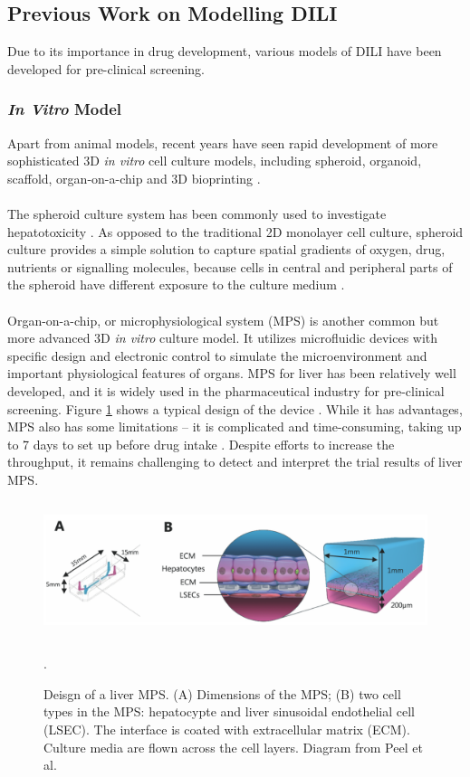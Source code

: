 \documentclass[12pt]{article}
\begin{document}
\subsection{Previous Work on Modelling DILI}
Due to its importance in drug development, various models of DILI have been developed for pre-clinical screening.
\subsubsection{\textit{In Vitro} Model}
Apart from animal models, recent years have seen rapid development of more sophisticated 3D \textit{in vitro} cell culture models, including spheroid, organoid, scaffold, organ-on-a-chip and 3D bioprinting \cite{fangThreeDimensionalCellCultures}.\\\\
The spheroid culture system has been commonly used to investigate hepatotoxicity \cite{leedaleSilicoguidedOptimisationOxygen2019}. As opposed to the traditional 2D monolayer cell culture, spheroid culture provides a simple solution to capture spatial gradients of oxygen, drug, nutrients or signalling molecules, because cells in central and peripheral parts of the spheroid have different exposure to the culture medium \cite{fangThreeDimensionalCellCultures}.\\\\Organ-on-a-chip, or microphysiological system (MPS) is another common but more advanced 3D \textit{in vitro} culture model. It utilizes microfluidic devices with specific design and electronic control to simulate the microenvironment and important physiological features of organs. MPS for liver has been relatively well developed, and it is widely used in the pharmaceutical industry for pre-clinical screening. Figure \ref{fig:2} shows a typical design of the device \cite{peelIntroducingAutomatedHigh2019a}. While it has advantages, MPS also has some limitations – it is complicated and time-consuming, taking up to 7 days to set up before drug intake \cite{peelIntroducingAutomatedHigh2019a}.
Despite efforts to increase the throughput, it remains challenging to detect and interpret the trial results of liver MPS.

\begin{figure}[h!]
\centering
\includegraphics[width = 14cm, height = 4cm]{mps.png}
\caption{Deisgn of a liver MPS. (A) Dimensions of the MPS; (B) two cell types in the MPS: hepatocypte and liver sinusoidal endothelial cell (LSEC). The interface is coated with extracellular matrix (ECM). Culture media are flown across the cell layers. Diagram from Peel et al. \cite{peelIntroducingAutomatedHigh2019a}}.
\label{fig:2}
\end{figure}
\end{document}
